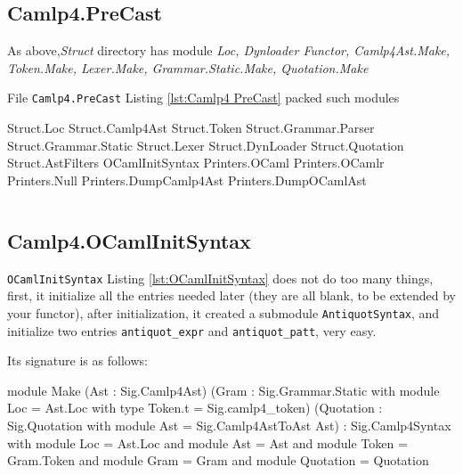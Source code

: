 \subsection{Camlp4.PreCast}
As above,\textit{Struct}
directory has module \textit{Loc, Dynloader
  Functor, Camlp4Ast.Make, Token.Make, Lexer.Make,
  Grammar.Static.Make, Quotation.Make}

File \verb|Camlp4.PreCast| Listing \ref{lst:Camlp4 PreCast}
packed such modules

\begin{bluetext}
  Struct.Loc Struct.Camlp4Ast Struct.Token Struct.Grammar.Parser
  Struct.Grammar.Static Struct.Lexer Struct.DynLoader Struct.Quotation
  Struct.AstFilters OCamlInitSyntax Printers.OCaml Printers.OCamlr
  Printers.Null Printers.DumpCamlp4Ast Printers.DumpOCamlAst
\end{bluetext}


\inputminted[fontsize=\scriptsize, 
lastline=55]{ocaml}{code/camlp4/source/precast.ml}



\subsection{Camlp4.OCamlInitSyntax}

\verb|OCamlInitSyntax| Listing \ref{lst:OCamlInitSyntax} does not do
too many things, first, it initialize all the entries needed later
(they are all blank, to be extended by your functor), after
initialization, it created a submodule \verb|AntiquotSyntax|, and
initialize two entries \verb|antiquot_expr| and \verb|antiquot_patt|,
very easy.

Its signature is as follows:
\begin{ocamlcode}
module Make (Ast     : Sig.Camlp4Ast)
            (Gram    : Sig.Grammar.Static with module Loc = Ast.Loc
                        with type Token.t = Sig.camlp4_token)
           (Quotation : Sig.Quotation with
                        module Ast = Sig.Camlp4AstToAst Ast)
: Sig.Camlp4Syntax with module Loc = Ast.Loc
                    and module Ast = Ast
                    and module Token = Gram.Token
                    and module Gram = Gram
                    and module Quotation = Quotation  
\end{ocamlcode}
                  
\inputminted[fontsize=\scriptsize,
firstline=55]{ocaml}{code/camlp4/source/precast.ml}



